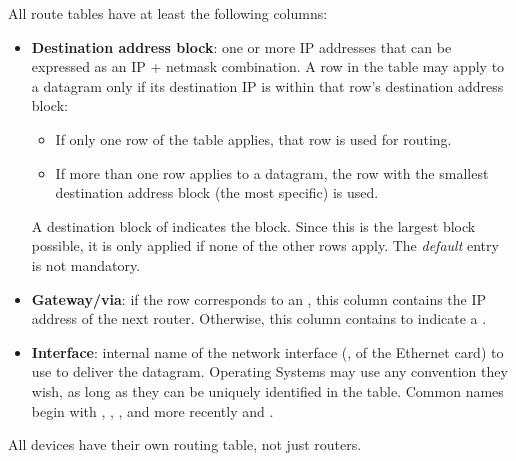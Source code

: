 All route tables have at least the following columns:
\begin{itemize}
\item \textbf{Destination address block}: one or more IP addresses that can be expressed as an IP + netmask combination.
  A row in the table may apply to a datagram only if its destination IP is within that row's destination address block:
  \begin{itemize}
  \item If only one row of the table applies, that row is used for routing.
  \item If more than one row applies to a datagram, the row with the smallest destination address block 
    (the most specific) is used.
  \end{itemize}
  A destination block of  indicates the  block.
  Since this is the largest block possible, it is only applied if none of the other rows apply. 
  The \textit{default} entry is not mandatory.\\[-0.3cm]
  
\item \textbf{Gateway/via}: if the row corresponds to an , this column contains the IP address
  of the next router. Otherwise, this column contains  to indicate a .\\[-0.3cm]
  
\item \textbf{Interface}: internal name of the network interface (\eg, of the Ethernet card) to use to deliver the 
  datagram. Operating Systems may use any convention they wish, as long as they can be uniquely identified in the table.
  Common names begin with , , , 
  and more recently  and .
\end{itemize}

\begin{remark}
All devices have their own routing table, not just routers.
\end{remark}


